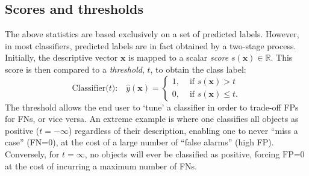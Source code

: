 \documentclass{article}
\begin{document}
\subsection{Scores and thresholds}
The above statistics are based exclusively on a set of predicted labels. However, in most classifiers, predicted labels are in fact obtained by a two-stage process. Initially, the descriptive vector $\mathbf{x}$ is mapped to a scalar \emph{score} $s(\mathbf{x}) \in \mathbb{R}$. This score is then compared to a \emph{threshold}, $t$, to obtain the class label:
\begin{equation}
 \text{Classifier($t$):}\quad \hat{y}(\mathbf{x}) = 
\begin{cases}
1, &\text{ if }s(\mathbf{x}) > t\\
0, &\text{ if }s(\mathbf{x}) \leq t.
\end{cases}\label{eq:classifier}
\end{equation}
The threshold allows the end user to `tune' a classifier in order to trade-off FPs for FNs, or vice versa. An extreme example is where one classifies all objects as positive ($t=-\infty$) regardless of their description, enabling one to never ``miss a case'' (FN=0), at the cost of a large number of ``false alarms'' (high FP). Conversely, for $t=\infty$, no objects will ever be classified as positive, forcing $\text{FP=0}$ at the cost of incurring a maximum number of FNs.
\end{document}
